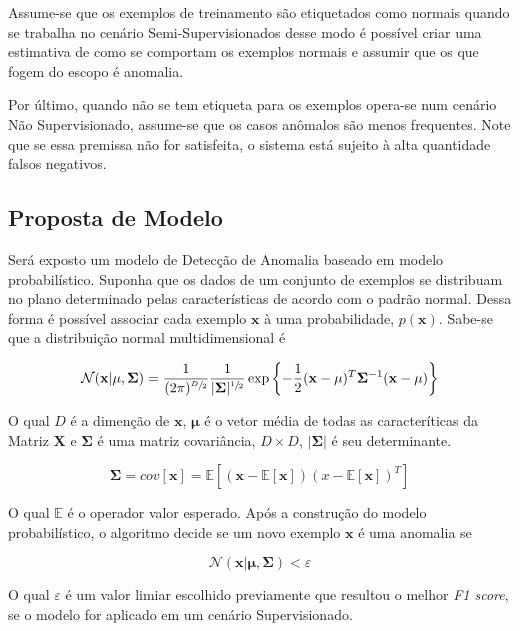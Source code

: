 Assume-se que os exemplos de treinamento são etiquetados como normais quando se trabalha no cenário Semi-Supervisionados desse modo é possível criar uma estimativa de como se comportam os exemplos normais e assumir que os que fogem do escopo é anomalia.

Por último, quando não se tem etiqueta para os exemplos opera-se num cenário Não Supervisionado, assume-se que os casos anômalos são menos frequentes. Note que se essa premissa não for satisfeita, o sistema está sujeito à alta quantidade falsos negativos.

\subsection{Proposta de Modelo}

Será exposto um modelo de Detecção de Anomalia baseado em modelo probabilístico. Suponha que os dados de um conjunto de exemplos se distribuam no plano determinado pelas características de acordo com o padrão normal. Dessa forma é possível associar cada exemplo \(\mathbf{x}\) à uma probabilidade, \(p(\mathbf{x})\).
Sabe-se \citep{bishop2006pattern} que a distribuição normal multidimensional é

\[\mathcal{N}(\mathbf{x}|\mathbf{\mu},\mathbf{\Sigma})=\frac{1}{(2\pi)^{\sfrac{D}{2}}} \frac{1}{|\mathbf{\Sigma}|^{\sfrac{1}{2}}}\exp\left\{ -\frac{1}{2} (\mathbf{x} - \mathbf{\mu})^T \mathbf{\Sigma}^{-1} (\mathbf{x} - \mathbf{\mu}) \right\}\]

O qual \(D\) é a dimenção de \(\mathbf{x}\), \(\mathbf{\mu}\) é o vetor média de todas as caracteríticas da Matriz \(\mathbf{X}\) e \(\mathbf{\Sigma}\) é uma matriz covariância, \(D \times D\), \(|\mathbf{\Sigma}|\) é seu determinante.

\[\mathbf{\Sigma}=\mathit{cov}[ \mathbf{x} ] = \mathbb{E} \left \lbrack ( \mathbf{x} - \mathbb{E} [ \mathbf{x} ] ) ( x - \mathbb{E} [ \mathbf{x} ] ) ^ T \right \rbrack \]

O qual \(\mathbb{E}\) é o operador valor esperado. Após a construção do modelo probabilístico, o algoritmo decide se um novo exemplo \(\mathbf{x}\) é uma anomalia se

\[\mathcal{N}(\mathbf{x}|\mathbf{\mu},\mathbf{\Sigma}) < \varepsilon\]

O qual \(\varepsilon\) é um valor limiar escolhido previamente que resultou o melhor \textit{F1 score}, se o modelo for aplicado em um cenário Supervisionado.

